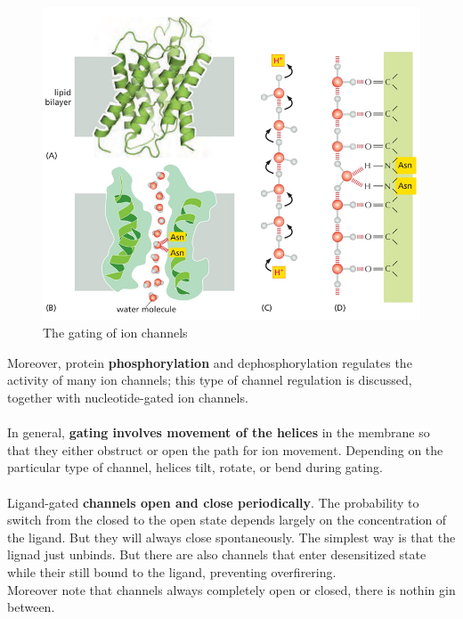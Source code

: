 \documentclass[../main.tex]{subfiles}
\begin{document}
\begin{figure}[H]
	\centering
	\includegraphics[width = 0.7 \textwidth]{19}
	\caption{The gating of ion channels}
	\label{gatingchannels}
\end{figure}
Moreover, protein \textbf{phosphorylation} and dephosphorylation regulates the activity of many ion channels; this type of channel regulation is discussed, together with nucleotide-gated ion channels. \\
\\
In general, \textbf{gating involves movement of the helices} in the membrane so that they either obstruct or open the path for ion movement. Depending on the particular type of channel, helices tilt, rotate, or bend during gating. \\
\\
Ligand-gated \textbf{channels open and close periodically}. The probability to switch from the closed to the open state depends largely on the concentration of the ligand. But they will always close spontaneously. The simplest way is that the lignad just unbinds. But there are also channels that enter desensitized state while their still bound to the ligand, preventing overfirering.\\
Moreover note that channels always completely open or closed, there is nothin gin between. 
\end{document}
